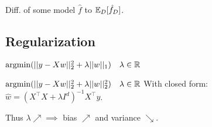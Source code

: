 \begin{definition}[\textcolor{H2}{Variance}]
  Diff. of some model \(\hat{f}\) to \(\operatorname{\mathbb{E}}_D[\hat{f}_D]\).
\end{definition}

\subsection*{Regularization}
\begin{definition}[Lasso]
  \(\operatorname{argmin}(||y - Xw||_2^2 + \lambda ||w||_1) \quad \lambda \in \operatorname{\mathbb{R}}\)
\end{definition}

\begin{definition}[Ridge]
  \(\operatorname{argmin}(||y - Xw||_2^2 + \lambda ||w||_2^2) \quad \lambda \in \operatorname{\mathbb{R}}\)
  With closed form: \(\hat{w} = (X^\top X + \lambda I^d)^{-1}X^\top y\).
\end{definition}

Thus \(\lambda \nearrow \implies\) bias \(\nearrow\) and variance \(\searrow\).